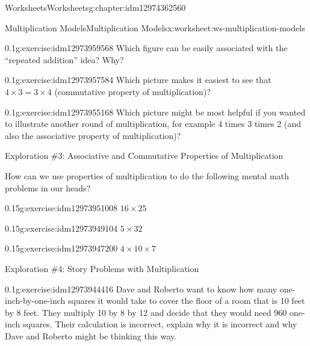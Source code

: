 \documentclass[twoside,11pt,]{book}
\begin{document}
\begin{chapterptx}{Worksheets}{}{Worksheets}{}{}{g:chapter:idm12974362560}
\begin{worksheet-section-numberless}{Multiplication Models}{}{Multiplication Models}{}{}{x:worksheet:ws-multiplication-models}
\begin{introduction}{}
\begin{description}
\end{description}
\end{introduction}%
\begin{divisionexercise}{5}{}{0.1}{g:exercise:idm12973959568}%
Which figure can be easily associated with the ``repeated addition'' idea? Why?%
\end{divisionexercise}%
\begin{divisionexercise}{6}{}{0.1}{g:exercise:idm12973957584}%
Which picture makes it easiest to see that \(4 \times 3 = 3 \times 4 \) (commutative property of multiplication)?%
\end{divisionexercise}%
\begin{divisionexercise}{7}{}{0.1}{g:exercise:idm12973955168}%
Which picture might be most helpful if you wanted to illustrate another round of multiplication, for example 4 times 3 times 2 (and also the associative property of multiplication)?%
\end{divisionexercise}%
\clearpage
\begin{introduction}{}%
Exploration \#3: Associative and Commutative Properties of Multiplication%
\par
How can we use properties of multiplication to do the following mental math problems in our heads?%
\end{introduction}%
\begin{divisionexercise}{8}{}{0.15}{g:exercise:idm12973951008}%
\(16 \times 25  \)%
\end{divisionexercise}%
\begin{divisionexercise}{9}{}{0.15}{g:exercise:idm12973949104}%
\(5 \times 32  \)%
\end{divisionexercise}%
\begin{divisionexercise}{10}{}{0.15}{g:exercise:idm12973947200}%
\(4 \times 10 \times 7  \)%
\end{divisionexercise}%
\begin{introduction}{}%
Exploration \#4: Story Problems with Multiplication\end{introduction}%
\begin{divisionexercise}{11}{}{0.1}{g:exercise:idm12973944416}%
Dave and Roberto want to know how many one-inch-by-one-inch squares it would take to cover the floor of a room that is 10 feet by 8 feet.  They multiply 10 by 8 by 12 and decide that they would need 960 one-inch squares.  Their calculation is incorrect, explain why it is incorrect and why Dave and Roberto might be thinking this way.%
\end{divisionexercise}%

\end{worksheet-section-numberless}
\end{chapterptx}
\end{document}
